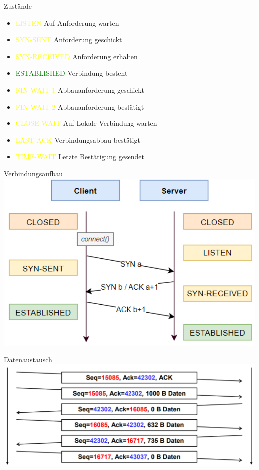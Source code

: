 \begin{definition}{Zustände}
    \begin{itemize}
        \item \textcolor{yellow}{LISTEN} Auf Anforderung warten
        \item \textcolor{yellow}{SYN-SENT} Anforderung geschickt
        \item \textcolor{yellow}{SYN-RECEIVED} Anforderung erhalten
        \item \textcolor{green}{ESTABLISHED} Verbindung besteht
        \item \textcolor{yellow}{FIN-WAIT-1} Abbauanforderung geschickt
        \item \textcolor{yellow}{FIN-WAIT-2} Abbauanforderung bestätigt
        \item \textcolor{yellow}{CLOSE-WAIT} Auf Lokale Verbindung warten
        \item \textcolor{yellow}{LAST-ACK} Verbindungsabbau bestätigt
        \item \textcolor{yellow}{TIME-WAIT} Letzte Bestätigung gesendet
    \end{itemize}
\end{definition}

\begin{KR}{Verbindungsaufbau}\\
        \includegraphics[width=1\linewidth]{images/verbindungsaufbau.png}
\end{KR}

\begin{KR}{Datenaustausch}\\
        \includegraphics[width=1\linewidth]{images/datenaustausch.png}
\end{KR}

